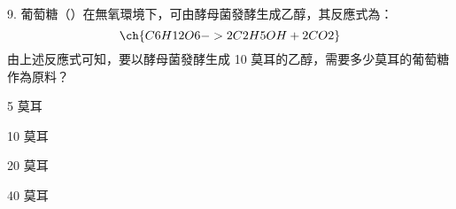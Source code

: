 \documentclass[12pt]{article}
\begin{document}
\begin{problem}
  \item[9.] 葡萄糖（）在無氧環境下，可由酵母菌發酵生成乙醇，其反應式為：
  \begin{equation*}
    \ch{C6H12O6 -> 2 C2H5OH + 2 CO2}
  \end{equation*}
  由上述反應式可知，要以酵母菌發酵生成 10 莫耳的乙醇，需要多少莫耳的葡萄糖作為原料？
  \begin{choices}
    \item 5 莫耳
    \item 10 莫耳
    \item 20 莫耳
    \item 40 莫耳
  \end{choices}
\end{problem}
\end{document}
